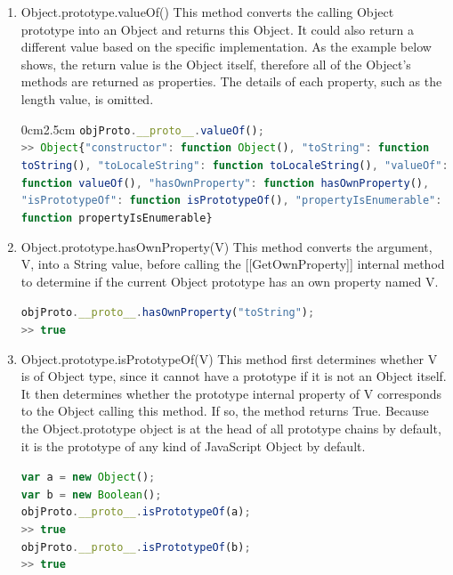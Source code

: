 \documentclass[a4paper,11pt,twoside]{report}
\def\jsinline{\lstinline[language=JavaScript, basicstyle=\small]}
\begin{document}
\begin{enumerate}
\item Object.prototype.valueOf() \newline
This method converts the calling Object prototype into an Object and returns this Object. It could also return a different value based on the specific implementation. As the example below shows, the return value is the Object itself, therefore all of the Object's methods are returned as properties. The details of each property, such as the length value, is omitted.
\begin{adjustwidth}{0cm}{2.5cm}
\jsinline|objProto.__proto__.valueOf();| \\
\jsinline|>> Object{"constructor": function Object(), "toString": function toString(), "toLocaleString": function toLocaleString(), "valueOf": function valueOf(), "hasOwnProperty": function hasOwnProperty(), "isPrototypeOf": function isPrototypeOf(), "propertyIsEnumerable": function propertyIsEnumerable}|
\end{adjustwidth}

\item Object.prototype.hasOwnProperty(V) \newline
This method converts the argument, V, into a String value, before calling the [[GetOwnProperty]] internal method to determine if the current Object prototype has an own property named V.

\jsinline|objProto.__proto__.hasOwnProperty("toString");|\\
\jsinline|>> true|

\item Object.prototype.isPrototypeOf(V) \newline
This method first determines whether V is of Object type, since it cannot have a prototype if it is not an Object itself. It then determines whether the prototype internal property of V corresponds to the Object calling this method. If so, the method returns True. Because the Object.prototype object is at the head of all prototype chains by default, it is the prototype of any kind of JavaScript Object by default.

\jsinline|var a = new Object();| \\
\jsinline|var b = new Boolean();| \\
\jsinline|objProto.__proto__.isPrototypeOf(a);| \\
\jsinline|>> true| \\
\jsinline|objProto.__proto__.isPrototypeOf(b);| \\
\jsinline|>> true|


\end{enumerate}
\end{document}
